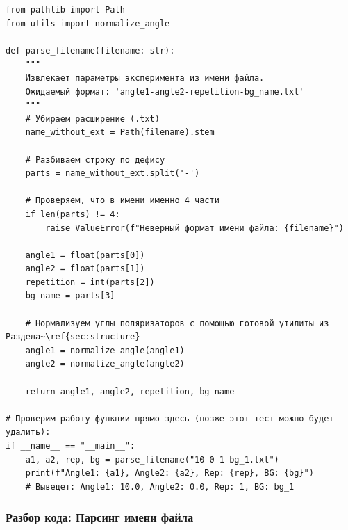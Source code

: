 \begin{listing}[H]
	\caption{Парсинг имени экспериментального файла ()}\label{lst:parse_filename}
	\begin{verbatim}
from pathlib import Path
from utils import normalize_angle

def parse_filename(filename: str):
    """
    Извлекает параметры эксперимента из имени файла.
    Ожидаемый формат: 'angle1-angle2-repetition-bg_name.txt'
    """
    # Убираем расширение (.txt)
    name_without_ext = Path(filename).stem

    # Разбиваем строку по дефису
    parts = name_without_ext.split('-')

    # Проверяем, что в имени именно 4 части
    if len(parts) != 4:
        raise ValueError(f"Неверный формат имени файла: {filename}")

    angle1 = float(parts[0])
    angle2 = float(parts[1])
    repetition = int(parts[2])
    bg_name = parts[3]

    # Нормализуем углы поляризаторов с помощью готовой утилиты из Раздела~\ref{sec:structure}
    angle1 = normalize_angle(angle1)
    angle2 = normalize_angle(angle2)

    return angle1, angle2, repetition, bg_name

# Проверим работу функции прямо здесь (позже этот тест можно будет удалить):
if __name__ == "__main__":
    a1, a2, rep, bg = parse_filename("10-0-1-bg_1.txt")
    print(f"Angle1: {a1}, Angle2: {a2}, Rep: {rep}, BG: {bg}")
    # Выведет: Angle1: 10.0, Angle2: 0.0, Rep: 1, BG: bg_1
	\end{verbatim}
\end{listing}

\subsubsection{Разбор кода: Парсинг имени файла}

